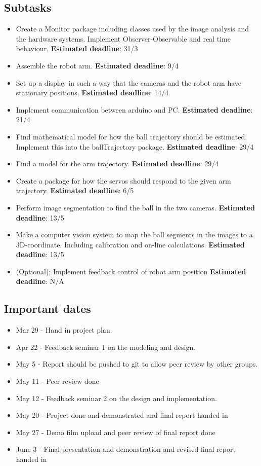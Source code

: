 \documentclass{article}
\begin{document}
\subsection{Subtasks}
    \begin{itemize}
        \item Create a Monitor package including classes used by the image analysis and the hardware systems. Implement Observer-Observable and real time behaviour. \textbf{Estimated deadline}: 31/3
        \item Assemble the robot arm. \textbf{Estimated deadline}: 9/4
        \item Set up a display in such a way that the cameras and the robot arm have stationary positions. \textbf{Estimated deadline}: 14/4
        \item Implement communication between arduino and PC. \textbf{Estimated deadline}: 21/4
        \item Find mathematical model for how the ball trajectory should be estimated. Implement this into the ballTrajectory package. \textbf{Estimated deadline}: 29/4
        \item Find a model for the arm trajectory. \textbf{Estimated deadline}: 29/4 
        
        \item Create a package for how the servos should respond to the given arm trajectory. \textbf{Estimated deadline}: 6/5
        \item Perform image segmentation to find the ball in the two cameras. \textbf{Estimated deadline}: 13/5
        \item Make a computer vision system to map the ball segments in the images to a 3D-coordinate. Including calibration and on-line calculations. \textbf{Estimated deadline}: 13/5
        \item (Optional); Implement feedback control of robot arm position \textbf{Estimated deadline}: N/A
    \end{itemize}
    
\subsection{Important dates}
    \begin{itemize}
        \item Mar 29 -  Hand in project plan.
        \item Apr 22 - Feedback seminar 1 on the modeling and design.
        \item May 5 - Report should be pushed to git to allow peer review by other groups.
        \item May 11 - Peer review done
        \item May 12 - Feedback seminar 2 on the design and implementation.
        \item May 20 - Project done and demonstrated and final report handed in
        \item May 27 - Demo film upload and peer review of final report done
        \item June 3 - Final presentation and demonstration and revised final report handed in
    \end{itemize}
\end{document}
